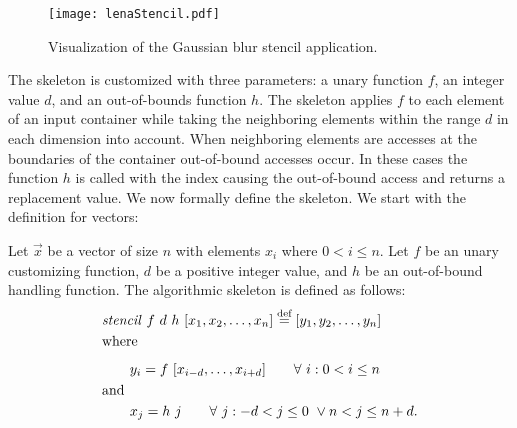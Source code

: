 \begin{figure}
  \centering
  \texttt{[image: lenaStencil.pdf]}
  \caption{Visualization of the Gaussian blur stencil application.}
  \label{fig:stencilExample}
\end{figure}

The \stencil skeleton is customized with three parameters: a unary function $f$, an integer value $d$, and an out-of-bounds function $h$.
The skeleton applies $f$ to each element of an input container while taking the neighboring elements within the range $d$ in each dimension into account.
When neighboring elements are accesses at the boundaries of the container out-of-bound accesses occur.
In these cases the function $h$ is called with the index causing the out-of-bound access and returns a replacement value.
We now formally define the \stencil skeleton. We start with the definition for vectors:
\begin{definition}
  \label{definition:mapoverlap}
  Let $\vec{x}$ be a vector of size $n$ with elements $x_i$ where $0 < i \leq n$.
  Let $f$ be an unary customizing function, $d$ be a positive integer value, and $h$ be an out-of-bound handling function.
  The algorithmic skeleton \stencil is defined as follows:
  \begin{equation*}
    \begin{split}
    &\stencil\ f\  d\ h\ [x_1, x_2, \ldots, x_n] \eqdef [y_1, y_2, \dots, y_n]\\
    &\text{where}\\[.5em]
    &\qquad y_i = f\ [x_{i-d}, \ldots, x_{i+d}] \qquad \forall\ i :  0 < i \leq n\\
    &\text{and\hfill}\\
    &\qquad x_j = h\ j \qquad \forall\ j : -d < j \leq 0\ \vee n < j \leq n+d .
    \end{split}
  \end{equation*}
\end{definition}

